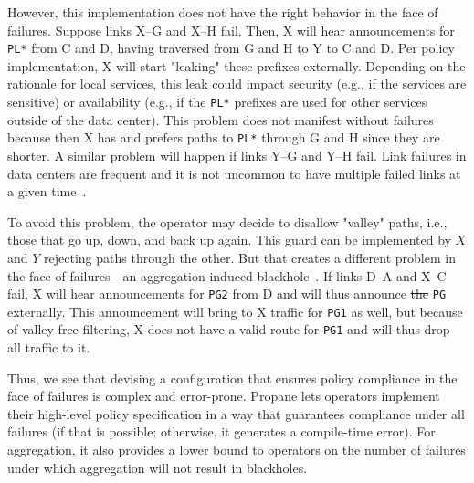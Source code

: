 \documentclass{sig-alternate-10pt}
\newcommand{\sysname}{{\small \sf Propane}\xspace}
\newcommand{\CD}[1]{\texttt{\small #1}}  %
\providecommand{\DIFdel}[1]{{\protect\color{red}\sout{#1}}}                      %
\providecommand{\DIFdelbegin}{} %
\providecommand{\DIFdelend}{} %
\begin{document}
However, this implementation does not have the right behavior in the face of failures. Suppose links X--G and X--H fail. Then, X will hear announcements for \CD{PL*} from C and D, having traversed from G and H to Y to C and D. Per policy implementation, X will start "leaking" these prefixes externally. Depending on the rationale for local services, this leak could impact security (e.g., if the services are sensitive) or availability (e.g., if the \CD{PL*} prefixes are used for other services outside of the data center). This problem does not manifest without failures because then X has and prefers paths to \CD{PL*} through G and H since they are shorter. A similar problem will happen if links Y--G and Y--H fail.
Link failures in data centers are frequent and it is not uncommon to have multiple failed links at a given time~\cite{dc-failure-study}.

To avoid this problem, the operator may decide to disallow "valley" paths, i.e., those that go up, down, and back up again. This guard can be implemented by $X$ and $Y$ rejecting paths through the other. But that creates a different problem in the face of failures---an aggregation-induced blackhole~\cite{route-aggregation}. If links D--A and X--C fail, X will hear announcements for \CD{PG2} from D and will thus announce \DIFdelbegin \DIFdel{the }\DIFdelend \CD{PG} externally. This announcement will bring to X traffic for \CD{PG1} as well, but because of valley-free filtering, X does not have a valid route for \CD{PG1} and will thus drop all traffic to it.

Thus, we see that devising a configuration that ensures policy compliance in the face of failures is complex and error-prone. \sysname lets operators implement their high-level policy specification in a way that guarantees compliance under all failures (if that is possible; otherwise, it generates a compile-time error). For aggregation, it also provides a lower bound to operators on the number of failures under which aggregation will not result in blackholes.
\end{document}

